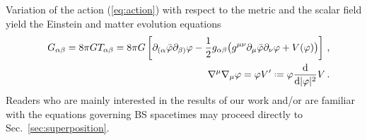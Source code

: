 \documentclass[]{iopart}
\newcommand{\du}{\mathrm{d}}
\newcommand*{\defeq}{\mathrel{\vcenter{\baselineskip0.5ex \lineskiplimit0pt
                     \hbox{\scriptsize.}\hbox{\scriptsize.}}}%
                     =}
\begin{document}
Variation of the action (\ref{eq:action}) with respect to the metric
and the scalar field yield the Einstein and matter evolution equations
%
\begin{eqnarray}
  &&G_{\alpha\beta} = 8\pi G T_{\alpha\beta}
  = 8\pi G\left[
  \partial_{(\alpha}\bar{\varphi}\partial_{\beta)}\varphi
  -\frac{1}{2}g_{\alpha\beta}
  \big(
  g^{\mu\nu}\partial_{\mu}
  \bar{\varphi}\partial_{\nu}\varphi+ V(\varphi)
  \big)
  \right]\,, \label{eq:Einstein} \\
  &&\nabla^{\mu}\nabla_{\mu}\varphi = \varphi V'
  \defeq \varphi \frac{\du}{\du |\varphi|^2}
  V\,.
  \label{eq:Boxvarphi}
\end{eqnarray}
%
Readers who are mainly interested in the results of our work and/or
are familiar with the equations governing BS spacetimes may proceed
directly to Sec.~\ref{sec:superposition}.


\end{document}

